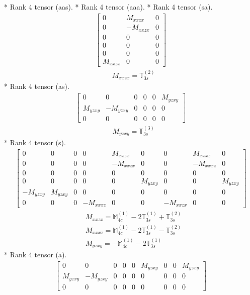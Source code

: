 \documentclass[fleqn,8pt,landscape]{jsarticle}
\begin{document}
* Rank 4 tensor (aas).
* Rank 4 tensor (aaa).
* Rank 4 tensor (sa).
\begin{align*}
\begin{bmatrix} 0 & M_{xxzx} & 0 \\ 0 & - M_{xxzx} & 0 \\ 0 & 0 & 0 \\ 0 & 0 & 0 \\ 0 & 0 & 0 \\ M_{xxzx} & 0 & 0 \end{bmatrix}
\end{align*}
\begin{align*}
& M_{xxzx} = \mathbb{T}_{3s}^{(2)}
\end{align*}
* Rank 4 tensor (as).
\begin{align*}
\begin{bmatrix} 0 & 0 & 0 & 0 & 0 & M_{yzxy} \\ M_{yzxy} & - M_{yzxy} & 0 & 0 & 0 & 0 \\ 0 & 0 & 0 & 0 & 0 & 0 \end{bmatrix}
\end{align*}
\begin{align*}
& M_{yzxy} = \mathbb{T}_{3s}^{(3)}
\end{align*}
* Rank 4 tensor (s).
\begin{align*}
\begin{bmatrix} 0 & 0 & 0 & 0 & M_{xxzx} & 0 & 0 & M_{xxxz} & 0 \\ 0 & 0 & 0 & 0 & - M_{xxzx} & 0 & 0 & - M_{xxxz} & 0 \\ 0 & 0 & 0 & 0 & 0 & 0 & 0 & 0 & 0 \\ 0 & 0 & 0 & 0 & 0 & M_{yzxy} & 0 & 0 & M_{yzxy} \\ - M_{yzxy} & M_{yzxy} & 0 & 0 & 0 & 0 & 0 & 0 & 0 \\ 0 & 0 & 0 & - M_{xxxz} & 0 & 0 & - M_{xxzx} & 0 & 0 \end{bmatrix}
\end{align*}
\begin{align*}
& M_{xxzx} = \mathbb{M}_{4c}^{(1)} - 2 \mathbb{T}_{3s}^{(1)} + \mathbb{T}_{3s}^{(2)} \\
& M_{xxxz} = \mathbb{M}_{4c}^{(1)} - 2 \mathbb{T}_{3s}^{(1)} - \mathbb{T}_{3s}^{(2)} \\
& M_{yzxy} = - \mathbb{M}_{4c}^{(1)} - 2 \mathbb{T}_{3s}^{(1)}
\end{align*}
* Rank 4 tensor (a).
\begin{align*}
\begin{bmatrix} 0 & 0 & 0 & 0 & 0 & M_{yzxy} & 0 & 0 & M_{yzxy} \\ M_{yzxy} & - M_{yzxy} & 0 & 0 & 0 & 0 & 0 & 0 & 0 \\ 0 & 0 & 0 & 0 & 0 & 0 & 0 & 0 & 0 \end{bmatrix}
\end{align*}
\end{document}
